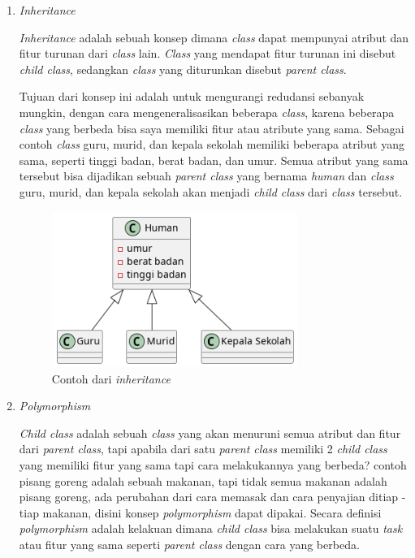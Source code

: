 \documentclass[a4paper]{article}
\begin{document}
\begin{enumerate}
    \item \textit{Inheritance}

    \textit{Inheritance} adalah sebuah konsep dimana \textit{class} dapat mempunyai atribut dan fitur turunan dari \textit{class} lain. \textit{Class} yang mendapat fitur turunan ini disebut \textit{child class}, sedangkan \textit{class} yang diturunkan disebut \textit{parent class}\autocite{education-erin-oop-2020}. 

    Tujuan dari konsep ini adalah untuk mengurangi redudansi sebanyak mungkin, dengan cara mengeneralisasikan beberapa \textit{class}, karena beberapa \textit{class} yang berbeda bisa saya memiliki fitur atau atribute yang sama. Sebagai contoh \textit{class} guru, murid, dan kepala sekolah memiliki beberapa atribut yang sama, seperti tinggi badan, berat badan, dan umur. Semua atribut yang sama tersebut bisa dijadikan sebuah \textit{parent class} yang bernama \textit{human} dan \textit{class} guru, murid, dan kepala sekolah akan menjadi \textit{child class} dari \textit{class} tersebut\autocite{liang_liang_2021}.

    \begin{figure}[h]
        \centering
        \includegraphics[width=8cm]{inheritance example.png}
        \caption{Contoh dari \textit{inheritance}}
    \end{figure}

    \item \textit{Polymorphism}

    \textit{Child class} adalah sebuah \textit{class} yang akan menuruni semua atribut dan fitur dari \textit{parent class}, tapi apabila dari satu \textit{parent class} memiliki 2 \textit{child class} yang memiliki fitur yang sama tapi cara melakukannya yang berbeda? contoh pisang goreng adalah sebuah makanan, tapi tidak semua makanan adalah pisang goreng, ada perubahan dari cara memasak dan cara penyajian ditiap - tiap makanan, disini konsep \textit{polymorphism} dapat dipakai. Secara definisi \textit{polymorphism} adalah kelakuan dimana \textit{child class} bisa melakukan suatu \textit{task} atau fitur yang sama seperti \textit{parent class} dengan cara yang berbeda\autocite{education-erin-oop-2020}.
\end{enumerate} 
\end{document}

